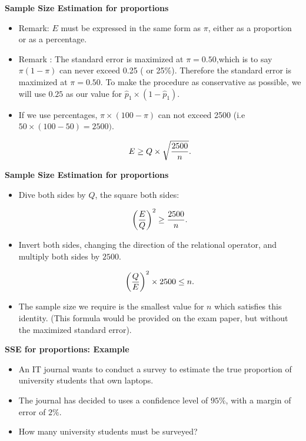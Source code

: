 
\textbf{Sample Size Estimation for proportions}
\begin{itemize}
\item  Remark: $E$ must be expressed in the same form as $\pi$, either as a proportion or as a percentage.
\item  Remark : The standard error is maximized at $\pi = 0.50$,which is to say $\pi(1-\pi)$ can never exceed 0.25 ( or 25\%). Therefore the standard error is maximized at $\pi = 0.50$. To make the procedure as conservative as possible, we will use $0.25$ as our value for $\hat{p}_1 \times (1 - \hat{p}_1)$.
\item  If we use percentages, $\pi \times (100-\pi)$ can not exceed 2500 (i.e $ 50 \times (100-50)=2500)$.

\[ E \geq Q \times \sqrt{{2500 \over n}}. \]


\end{itemize}



\textbf{Sample Size Estimation for proportions}

\begin{itemize}

\item  Dive both sides by $Q$, the square both sides:

\[ \left({E\over Q}\right)^2 \geq {2500 \over n}. \]

\item  Invert both sides, changing the direction of the relational operator, and multiply both sides by $2500$.

\[ \left({Q\over E}\right)^2 \times 2500 \leq n. \]

\item  The sample size we require is the smallest value for $n$ which satisfies this identity. (This formula would be provided on the exam paper, but without the maximized standard error).
\end{itemize}


\textbf{SSE for proportions: Example}
\begin{itemize}
\item  An IT journal wants to conduct a survey to estimate the true proportion of university students that own laptops.
\item  The journal has decided to uses a confidence level of $95\%$, with a margin of error of $2\%$.
\item  How many university students must be surveyed?
\end{itemize}


